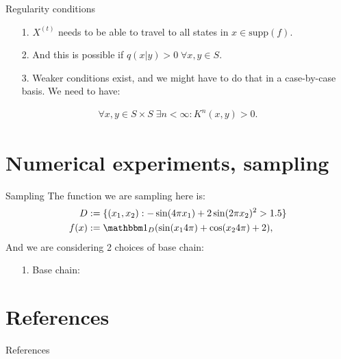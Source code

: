 \documentclass[11pt]{beamer}
\begin{document}
    \begin{frame}{Regularity conditions}
        \begin{itemize}
            \item [1.] $X^{(t)}$ needs to be able to travel to all states in $x\in \text{supp}(f)$. 
            \item [2.] And this is possible if $q(x|y) > 0 \;\forall x, y\in S$. 
            \item [3.] Weaker conditions exist, and we might have to do that in a case-by-case basis. We need to have: 
        \end{itemize}
        \begin{align*}
           \forall x,y \in S\times S \;\exists n < \infty: K^n(x, y) > 0. 
        \end{align*}
    \end{frame}

\section{Numerical experiments, sampling}
    \begin{frame}{Sampling}
        The function we are sampling here is: 
        \begin{align*}
            D &:= \{(x_1, x_2): -\sin(4\pi x_1) + 2\sin(2\pi x_2)^2 > 1.5\}
            \\
            f(x) &:= \mathbbm 1_D (\sin(x_14\pi) + \cos(x_24\pi) + 2), 
        \end{align*}
        And we are considering 2 choices of base chain: 
        \begin{itemize}
            \item [1.] Base chain: 
        \end{itemize}
    \end{frame}

    

\section{References}
    \begin{frame}{References}
        
    \end{frame}
\end{document}
